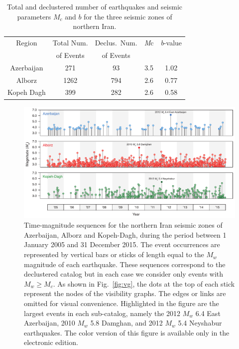 \begin{table}
	\selectfont
	\caption{Total and declustered number of earthquakes and seismic parameters $M_c$ and $b$ for the three seismic zones of northern Iran.}
	\centering\small
	\begin{tabular}{|ccccc|}
		\hline
		Region      & Total Num. & Declus.~Num. & \textit{M}c & \textit{b}-value \\ 
		            & of Events  & of Events &             &                  \\
		\hline
		Azerbaijan  &        271 &        93 &         3.5 &             1.02 \\
		Alborz      &       1262 &       794 &         2.6 &             0.77 \\
		Kopeh Dagh  &        399 &       282 &         2.6 &             0.58 \\
		\hline
	\end{tabular}
	\label{tab:seismicity}
\end{table}

\begin{figure}[t]
	\centering
	\includegraphics[width=\textwidth]{figures/pdf/figure-05} 
	\caption{Time-magnitude sequences for the northern Iran seismic zones of Azerbaijan, Alborz and Kopeh-Dagh, during the period between 1 January 2005 and 31 December 2015. The event occurrences are represented by vertical bars or sticks of length equal to the $M_w$ magnitude of each earthquake. These sequences correspond to the declustered catalog but in each case we consider only events with $M_w \geq M_c$. As shown in Fig.~\ref{fig:vg}, the dots at the top of each stick represent the nodes of the visibility graphs. The edges or links are omitted for visual convenience. Highlighted in the figure are the largest events in each sub-catalog, namely the 2012 $M_w$ 6.4 East Azerbaijan, 2010 $M_w$ 5.8 Damghan, and 2012 $M_w$ 5.4 Neyshabur earthquakes. The color version of this figure is available only in the electronic edition.}
	\label{fig:mag-time}
\end{figure}


